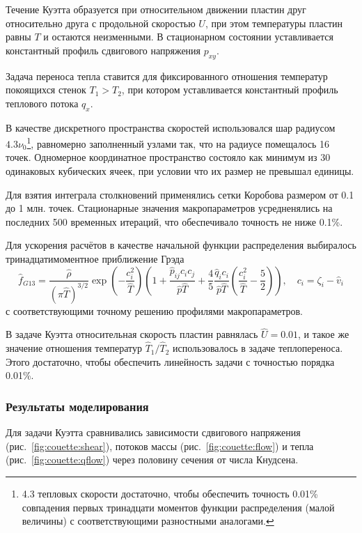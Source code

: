 Течение Куэтта образуется при относительном движении пластин друг относительно друга с продольной скоростью \(U\),
при этом температуры пластин равны \(T\) и остаются неизменными.
В стационарном состоянии уставливается константный профиль сдвигового напряжения \(p_{xy}\).

Задача переноса тепла ставится для фиксированного отношения температур покоящихся стенок \(T_1>T_2\),
при котором уставливается константный профиль теплового потока \(q_x\).

В качестве дискретного пространства скоростей использовался шар радиусом \(4.3\nu_0\)\footnote
{
	4.3 тепловых скорости достаточно, чтобы обеспечить точность 0.01\% совпадения
	первых тринадцати моментов функции распределения (малой величины) с соответствующими разностными аналогами.
},
равномерно заполненный узлами так, что на радиусе помещалось 16 точек.
Одномерное координатное пространство состояло как минимум из 30 одинаковых кубических ячеек,
при условии что их размер не превышал единицы.

Для взятия интеграла столкновений применялись сетки Коробова размером от 0.1 до 1 млн. точек.
Стационарные значения макропараметров усредненялись на последних 500 временных итераций,
что обеспечивало точность не ниже 0.1\%.

Для ускорения расчётов в качестве начальной функции распределения выбиралось тринадцатимоментное приближение Грэда
\[ 
	\hat{f}_{G13} = \frac{\hat\rho}{(\pi\hat T)^{3/2}}\exp\left(-\frac{c_i^2}{\hat T}\right)
	\left( 1+\frac{\hat p_{ij}c_ic_j}{\hat p\hat T} + \frac4{5}\frac{\hat q_ic_i}{\hat p\hat T}\left(\frac{c_i^2}{\hat T}-\frac5{2}\right) \right),
	\quad c_i = \zeta_i - \hat v_i
\]
с соответствующими точному решению профилями макропараметров.

В задаче Куэтта относительная скорость пластин равнялась \(\hat{U}=0.01\),
и такое же значение отношения температур \(\hat{T}_1/\hat{T}_2\) использовалось в задаче теплопереноса.
Этого достаточно, чтобы обеспечить линейность задачи с точностью порядка 0.01\%.

\subsubsection{Результаты моделирования}

Для задачи Куэтта сравнивались зависимости сдвигового напряжения (рис.~\ref{fig:couette:shear}),
потоков массы (рис.~\ref{fig:couette:flow}) и тепла (рис.~\ref{fig:couette:qflow})
через половину сечения от числа Кнудсена.

